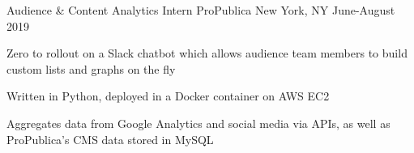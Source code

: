 \begin{cventries}
  \cventry
    {Audience \& Content Analytics Intern}
    {ProPublica}
    {New York, NY}
    {June-August 2019}
    {
      \begin{cvitems}
        \item {
          Zero to rollout on a Slack chatbot which allows audience team
          members to build custom lists and graphs on the fly
        }
        \item {
          Written in Python, deployed in a Docker container on AWS EC2
        }
        \item {
          Aggregates data from Google Analytics and social media via APIs, as well
          as ProPublica's CMS data stored in MySQL
        }
      \end{cvitems}
    }

\end{cventries}
